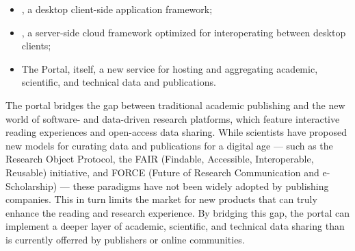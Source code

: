 \documentclass[11pt,letterpaper]{article}
\newenvironment{cframed}{\begin{mdframed}[linecolor=logoPeach,linewidth=0.4mm]}{\end{mdframed}}
\begin{document}
\vspace{.5em}
\begin{cframed}
\begin{itemize}
\vspace*{-.5em}
\item {\VersatileUX}, a desktop client-side application 
framework; 
\vspace*{-.5em}
\item {\NDPCloud}, a server-side cloud framework 
optimized for interoperating between desktop 
clients; 
\vspace*{-.5em}
\item The {\MOSAIC} Portal, itself, a new service for 
hosting and aggregating academic, scientific, and technical 
data and publications.
\end{itemize}
\vspace*{-.5em}
\end{cframed}
\vspace{.5em}
\p{}
The {\MOSAIC} portal bridges the gap between 
traditional academic publishing and the new 
world of software- and data-driven research platforms, 
which feature interactive reading experiences 
and open-access data sharing.  While scientists have 
proposed new models for curating data and publications 
for a digital age --- such as the Research Object Protocol, 
the FAIR (Findable, Accessible, Interoperable, 
Reusable) initiative, and 
FORCE (Future of Research Communication and e-Scholarship) 
--- these paradigms have not been widely adopted by 
publishing companies.  This in turn limits the market 
for new products that can truly enhance the 
reading and research experience.  By bridging 
this gap, 
the {\MOSAIC} portal can implement a deeper layer of 
academic, scientific, and technical data sharing 
than is currently offerred by publishers or online 
communities.
\end{document}
